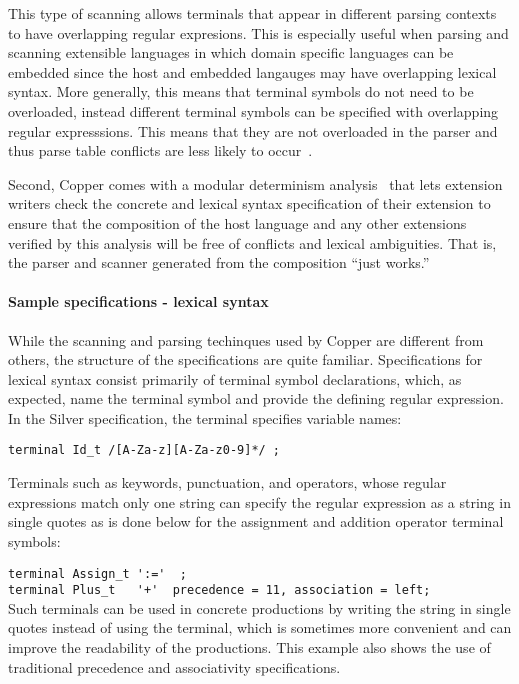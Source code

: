 This type of scanning allows terminals that appear in different
parsing contexts to have overlapping regular expresions.  This is
especially useful when parsing and scanning extensible languages in
which domain specific languages can be embedded since the host and
embedded langauges may have overlapping lexical syntax.  More
generally, this means that terminal symbols do not need to be
overloaded, instead different terminal symbols can be specified with
overlapping regular expresssions.  This means that they are not
overloaded in the parser and thus parse table conflicts are less
likely to occur~\cite{vanwyk07gpce}.

Second, Copper comes with a modular determinism
analysis~\cite{schwerdfeger09pldi} that lets extension writers check
the concrete and lexical syntax specification of their extension to
ensure that the composition of the host language and any other
extensions verified by this analysis will be free of conflicts and
lexical ambiguities.  That is, the parser and scanner generated from
the composition ``just works.''


\paragraph{Sample specifications - lexical syntax}
While the scanning and parsing techinques used by Copper are different
from others, the structure of the specifications are quite familiar.
%
Specifications for lexical syntax consist primarily of terminal symbol
declarations, which, as expected, name the terminal symbol and provide
the defining regular expression.  In the Silver specification, the
 terminal specifies variable names:

\noindent
\verb!terminal Id_t /[A-Za-z][A-Za-z0-9]*/ ;!

Terminals such as keywords, punctuation, and operators, whose regular
expressions match only one string can specify the regular expression
as a string in single quotes as is done below for the assignment and
addition operator terminal symbols:

\noindent
\verb!terminal Assign_t ':='  ;! \\
\verb!terminal Plus_t   '+'  precedence = 11, association = left;! \\
%
Such terminals can be used in concrete productions by writing the
string in single quotes instead of using the terminal, which is
sometimes more convenient and can improve the readability of the
productions. 
%
This example also shows the use of traditional precedence and
associativity specifications.

